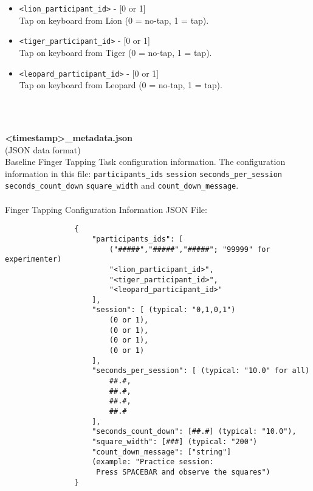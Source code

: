 \begin{description}
\begin{addmargin}[0em]{0em}
\begin{addmargin}[1em]{0em}
\begin{itemize}
                \item \verb|<lion_participant_id>| - [0 or 1]\\Tap on keyboard from Lion (0 = no-tap, 1 = tap).
                \item \verb|<tiger_participant_id>| - [0 or 1]\\Tap on keyboard from Tiger (0 = no-tap, 1 = tap).
                \item \verb|<leopard_participant_id>| - [0 or 1]\\Tap on keyboard from Leopard (0 = no-tap, 1 = tap).
            \end{itemize}
        \end{addmargin} %


        \textbf{\\\\}
        \begin{addmargin}[1em]{0em} %
            \label{finger_tapping/<timestamp>_metadata.json}
            \textbf{<timestamp>\_metadata.json}\\(JSON data format)\\
            Baseline Finger Tapping Task configuration information. The configuration
            information in this file: \verb|participants_ids| \verb|session|
            \verb|seconds_per_session| \verb|seconds_count_down| \verb|square_width| and
            \verb|count_down_message|.\\\\
            Finger Tapping Configuration Information JSON File:
            \begin{verbatim}
                {
                    "participants_ids": [
                        ("#####","#####","#####"; "99999" for experimenter)
                        "<lion_participant_id>",
                        "<tiger_participant_id>",
                        "<leopard_participant_id>"
                    ],
                    "session": [ (typical: "0,1,0,1")
                        (0 or 1),
                        (0 or 1),
                        (0 or 1),
                        (0 or 1)
                    ],
                    "seconds_per_session": [ (typical: "10.0" for all)
                        ##.#,
                        ##.#,
                        ##.#,
                        ##.#
                    ],
                    "seconds_count_down": [##.#] (typical: "10.0"),
                    "square_width": [###] (typical: "200")
                    "count_down_message": ["string"]
                    (example: "Practice session:
                     Press SPACEBAR and observe the squares")
                }
            \end{verbatim}
        \end{addmargin} %


\end{addmargin}
\end{description}

